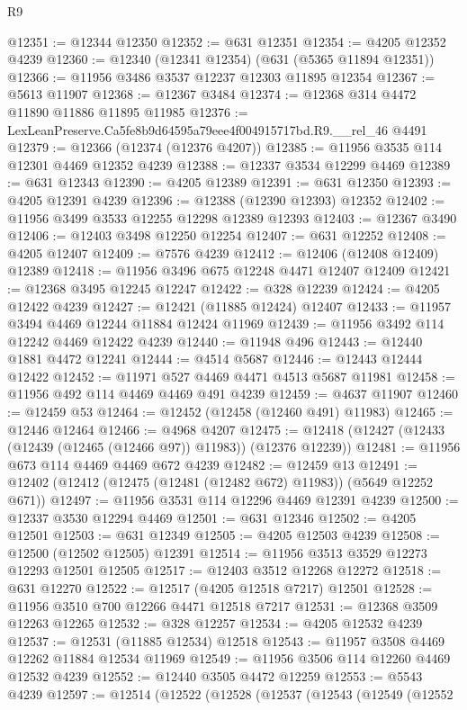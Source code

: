 \begin{lexlean}{R9}
\begin{coremodule}
@12351 := @12344 @12350
@12352 := @631 @12351
@12354 := @4205 @12352 @4239
@12360 := @12340 (@12341 @12354) (@631 (@5365 @11894 @12351))
@12366 := @11956 @3486 @3537 @12237 @12303 @11895 @12354
@12367 := @5613 @11907
@12368 := @12367 @3484
@12374 := @12368 @314 @4472 @11890 @11886 @11895 @11985
@12376 := LexLeanPreserve.Ca5fe8b9d64595a79eee4f004915717bd.R9.__rel_46 @4491
@12379 := @12366 (@12374 (@12376 @4207))
@12385 := @11956 @3535 @114 @12301 @4469 @12352 @4239
@12388 := @12337 @3534 @12299 @4469
@12389 := @631 @12343
@12390 := @4205 @12389
@12391 := @631 @12350
@12393 := @4205 @12391 @4239
@12396 := @12388 (@12390 @12393) @12352
@12402 := @11956 @3499 @3533 @12255 @12298 @12389 @12393
@12403 := @12367 @3490
@12406 := @12403 @3498 @12250 @12254
@12407 := @631 @12252
@12408 := @4205 @12407
@12409 := @7576 @4239
@12412 := @12406 (@12408 @12409) @12389
@12418 := @11956 @3496 @675 @12248 @4471 @12407 @12409
@12421 := @12368 @3495 @12245 @12247
@12422 := @328 @12239
@12424 := @4205 @12422 @4239
@12427 := @12421 (@11885 @12424) @12407
@12433 := @11957 @3494 @4469 @12244 @11884 @12424 @11969
@12439 := @11956 @3492 @114 @12242 @4469 @12422 @4239
@12440 := @11948 @496
@12443 := @12440 @1881 @4472 @12241
@12444 := @4514 @5687
@12446 := @12443 @12444 @12422
@12452 := @11971 @527 @4469 @4471 @4513 @5687 @11981
@12458 := @11956 @492 @114 @4469 @4469 @491 @4239
@12459 := @4637 @11907
@12460 := @12459 @53
@12464 := @12452 (@12458 (@12460 @491) @11983)
@12465 := @12446 @12464
@12466 := @4968 @4207
@12475 := @12418 (@12427 (@12433 (@12439 (@12465 (@12466 @97)) @11983)) (@12376 @12239))
@12481 := @11956 @673 @114 @4469 @4469 @672 @4239
@12482 := @12459 @13
@12491 := @12402 (@12412 (@12475 (@12481 (@12482 @672) @11983)) (@5649 @12252 @671))
@12497 := @11956 @3531 @114 @12296 @4469 @12391 @4239
@12500 := @12337 @3530 @12294 @4469
@12501 := @631 @12346
@12502 := @4205 @12501
@12503 := @631 @12349
@12505 := @4205 @12503 @4239
@12508 := @12500 (@12502 @12505) @12391
@12514 := @11956 @3513 @3529 @12273 @12293 @12501 @12505
@12517 := @12403 @3512 @12268 @12272
@12518 := @631 @12270
@12522 := @12517 (@4205 @12518 @7217) @12501
@12528 := @11956 @3510 @700 @12266 @4471 @12518 @7217
@12531 := @12368 @3509 @12263 @12265
@12532 := @328 @12257
@12534 := @4205 @12532 @4239
@12537 := @12531 (@11885 @12534) @12518
@12543 := @11957 @3508 @4469 @12262 @11884 @12534 @11969
@12549 := @11956 @3506 @114 @12260 @4469 @12532 @4239
@12552 := @12440 @3505 @4472 @12259
@12553 := @5543 @4239
@12597 := @12514
    (@12522
      (@12528
        (@12537
          (@12543
            (@12549
              (@12552

\end{coremodule}
\end{lexlean}
